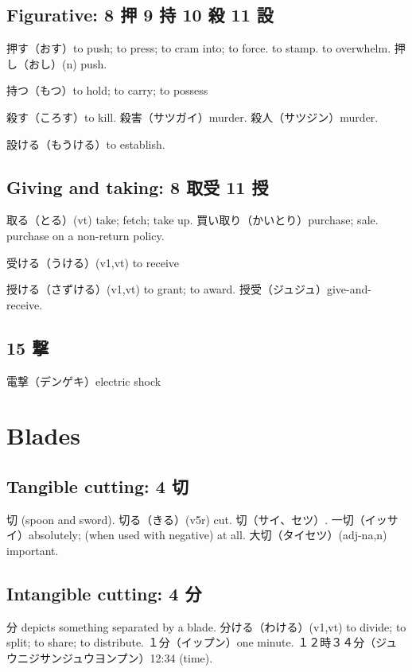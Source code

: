 \subsection{Figurative: 8 押 9 持 10 殺 11 設}

押す（おす）to push; to press; to cram into; to force.
to stamp.
to overwhelm.
押し（おし）(n) push.

持つ（もつ）to hold; to carry; to possess

殺す（ころす）to kill.
殺害（サツガイ）murder.
殺人（サツジン）murder.

設ける（もうける）to establish.

\subsection{Giving and taking: 8 取受 11 授}

取る（とる）(vt) take; fetch; take up.
買い取り（かいとり）purchase; sale. purchase on a non-return policy.

受ける（うける）(v1,vt) to receive

授ける（さずける）(v1,vt) to grant; to award.
授受（ジュジュ）give-and-receive.

\subsection{15 撃}

電撃（デンゲキ）electric shock

\section{Blades}

\subsection{Tangible cutting: 4 切}

切 (spoon and sword).
切る（きる）(v5r) cut.
切（サイ、セツ）.
一切（イッサイ）absolutely; (when used with negative) at all.
大切（タイセツ）(adj-na,n) important.

\subsection{Intangible cutting: 4 分}

分 depicts something separated by a blade.
分ける（わける）(v1,vt) to divide; to split; to share; to distribute.
１分（イップン）one minute.
１２時３４分（ジュウニジサンジュウヨンプン）12:34 (time).

